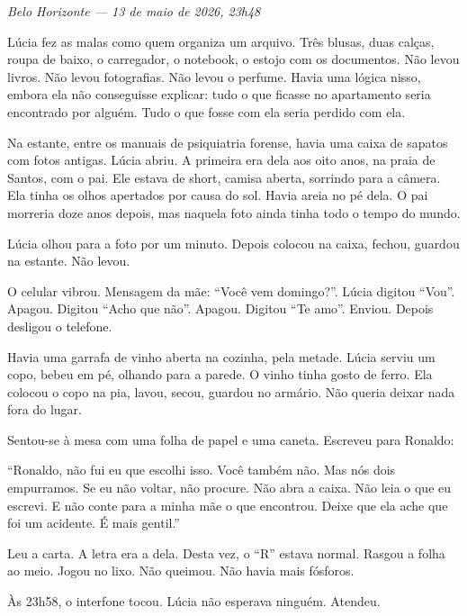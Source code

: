 
\noindent \textit{Belo Horizonte --- 13 de maio de 2026, 23h48}

\noindent Lúcia fez as malas como quem organiza um arquivo. Três blusas, duas calças, roupa de baixo, o carregador, o notebook, o estojo com os documentos. Não levou livros. Não levou fotografias. Não levou o perfume. Havia uma lógica nisso, embora ela não conseguisse explicar: tudo o que ficasse no apartamento seria encontrado por alguém. Tudo o que fosse com ela seria perdido com ela.

\noindent Na estante, entre os manuais de psiquiatria forense, havia uma caixa de sapatos com fotos antigas. Lúcia abriu. A primeira era dela aos oito anos, na praia de Santos, com o pai. Ele estava de short, camisa aberta, sorrindo para a câmera. Ela tinha os olhos apertados por causa do sol. Havia areia no pé dela. O pai morreria doze anos depois, mas naquela foto ainda tinha todo o tempo do mundo.

\noindent Lúcia olhou para a foto por um minuto. Depois colocou na caixa, fechou, guardou na estante. Não levou.

\noindent O celular vibrou. Mensagem da mãe: ``Você vem domingo?''. Lúcia digitou ``Vou''. Apagou. Digitou ``Acho que não''. Apagou. Digitou ``Te amo''. Enviou. Depois desligou o telefone.

\noindent Havia uma garrafa de vinho aberta na cozinha, pela metade. Lúcia serviu um copo, bebeu em pé, olhando para a parede. O vinho tinha gosto de ferro. Ela colocou o copo na pia, lavou, secou, guardou no armário. Não queria deixar nada fora do lugar.

\noindent Sentou-se à mesa com uma folha de papel e uma caneta. Escreveu para Ronaldo:

\noindent ``Ronaldo, não fui eu que escolhi isso. Você também não. Mas nós dois empurramos. Se eu não voltar, não procure. Não abra a caixa. Não leia o que eu escrevi. E não conte para a minha mãe o que encontrou. Deixe que ela ache que foi um acidente. É mais gentil.''

\noindent Leu a carta. A letra era a dela. Desta vez, o ``R'' estava normal. Rasgou a folha ao meio. Jogou no lixo. Não queimou. Não havia mais fósforos.

\noindent Às 23h58, o interfone tocou. Lúcia não esperava ninguém. Atendeu.

